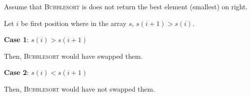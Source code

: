 \begin{example}
    Assume that \textsc{Bubblesort} is does not return the best element (smallest) on right. 

    Let $i$ be first position where in the array $s$, $s(i + 1) > s(i)$.

    \begin{listo}
        \item \textbf{Case 1}: $s(i) > s(i+1)$
        
        Then, \textsc{Bubblesort} would have swapped them. 

        \item \textbf{Case 2}: $s(i) < s(i+1)$
        
        Then, \textsc{Bubblesort} would have not swapped them.
    \end{listo}
\end{example}